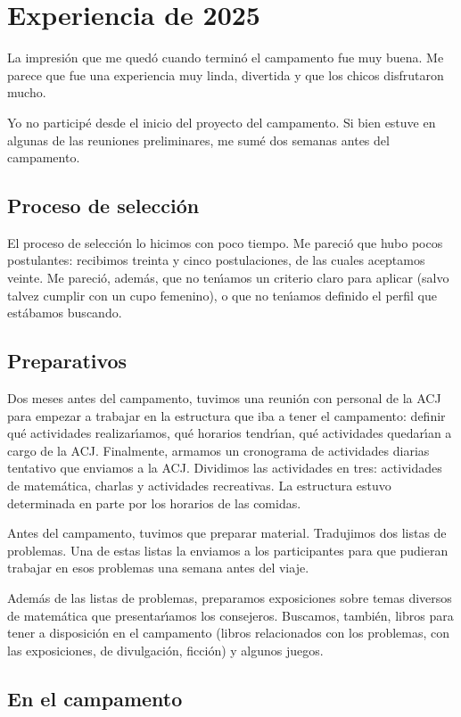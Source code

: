 \section{Experiencia de 2025}
La impresi\'on que me qued\'o cuando termin\'o el campamento fue muy buena.
Me parece que fue una experiencia muy linda, divertida y que los chicos
disfrutaron mucho.

Yo no particip\'e desde el inicio del proyecto del campamento.
Si bien estuve en algunas de las reuniones preliminares,
me sum\'e dos semanas antes del campamento.

\subsection{Proceso de selecci\'on}
El proceso de selecci\'on lo hicimos con poco tiempo.
Me pareci\'o que hubo pocos postulantes: recibimos treinta y cinco
postulaciones, de las cuales aceptamos veinte.
Me pareci\'o, adem\'as, que no ten\'{\i}amos un criterio claro
para aplicar (salvo talvez cumplir con un cupo femenino),
o que no ten\'{\i}amos definido el perfil que est\'abamos buscando.

\subsection{Preparativos}
Dos meses antes del campamento, tuvimos una reuni\'on con personal
de la ACJ para empezar a trabajar en la estructura que iba a tener
el campamento: definir qu\'e actividades realizar\'{\i}amos, qu\'e
horarios tendr\'{\i}an, qu\'e actividades quedar\'{\i}an a cargo de
la ACJ. Finalmente, armamos un cronograma de actividades diarias
tentativo que enviamos a la ACJ. Dividimos las actividades en tres:
actividades de matem\'atica, charlas y actividades recreativas.
La estructura estuvo determinada en parte por los horarios de las
comidas.

Antes del campamento, tuvimos que preparar material.
Tradujimos dos listas de problemas. Una de estas listas la enviamos
a los participantes para que pudieran trabajar en esos problemas una
semana antes del viaje.

Adem\'as de las listas de problemas, preparamos exposiciones sobre
temas diversos de matem\'atica que presentar\'{\i}amos los consejeros.
Buscamos, tambi\'en, libros para tener a disposici\'on en el campamento
(libros relacionados con los problemas, con las exposiciones, de
divulgaci\'on, ficci\'on) y algunos juegos.

\subsection{En el campamento}

